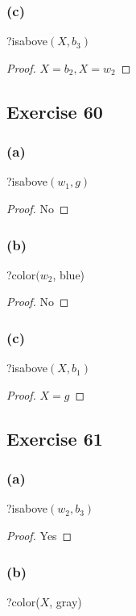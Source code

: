 \documentclass[14pt]{extarticle}
\begin{document}
\subsubsection{(c)}
?isabove$(X, b_3)$

\begin{proof}
    $X = b_2, X = w_2$
\end{proof}

\subsection{Exercise 60}

\subsubsection{(a)}
?isabove$(w_1, g)$

\begin{proof}
    No
\end{proof}

\subsubsection{(b)}
?color$(w_2$, blue)

\begin{proof}
    No
\end{proof}

\subsubsection{(c)}
?isabove$(X, b_1)$

\begin{proof}
    $X = g$
\end{proof}

\subsection{Exercise 61}

\subsubsection{(a)}
?isabove$(w_2, b_3)$

\begin{proof}
    Yes
\end{proof}

\subsubsection{(b)}
?color($X$, gray)
\end{document}

